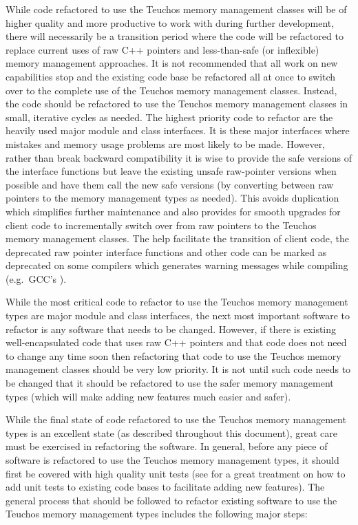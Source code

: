 \documentclass[pdf,ps2pdf,11pt]{SANDreport}
\begin{document}
While code refactored to use the Teuchos memory management classes
will be of higher quality and more productive to work with during
further development, there will necessarily be a transition period
where the code will be refactored to replace current uses of raw C++
pointers and less-than-safe (or inflexible) memory management
approaches.  It is not recommended that all work on new capabilities
stop and the existing code base be refactored all at once to switch
over to the complete use of the Teuchos memory management classes.
Instead, the code should be refactored to use the Teuchos memory
management classes in small, iterative cycles as needed.  The highest
priority code to refactor are the heavily used major module and class
interfaces.  It is these major interfaces where mistakes and memory
usage problems are most likely to be made.  However, rather than break
backward compatibility it is wise to provide the safe versions of the
interface functions but leave the existing unsafe raw-pointer versions
when possible and have them call the new safe versions (by converting
between raw pointers to the memory management types as needed).  This
avoids duplication which simplifies further maintenance and also
provides for smooth upgrades for client code to incrementally switch
over from raw pointers to the Teuchos memory management classes.  The
help facilitate the transition of client code, the deprecated raw
pointer interface functions and other code can be marked as deprecated
on some compilers which generates warning messages while compiling
(e.g.\ GCC's {}).

While the most critical code to refactor to use the Teuchos memory
management types are major module and class interfaces, the next most
important software to refactor is any software that needs to be
changed.  However, if there is existing well-encapsulated code that
uses raw C++ pointers and that code does not need to change any time
soon then refactoring that code to use the Teuchos memory management
classes should be very low priority.  It is not until such code needs
to be changed that it should be refactored to use the safer memory
management types (which will make adding new features much easier and
safer).

While the final state of code refactored to use the Teuchos memory
management types is an excellent state (as described throughout this
document), great care must be exercised in refactoring the software.
In general, before any piece of software is refactored to use the
Teuchos memory management types, it should first be covered with high
quality unit tests (see {}\cite{WorkingEffectivelyWithLegacyCode05}
for a great treatment on how to add unit tests to existing code bases
to facilitate adding new features).  The general process that should
be followed to refactor existing software to use the Teuchos memory
management types includes the following major steps:
\end{document}
